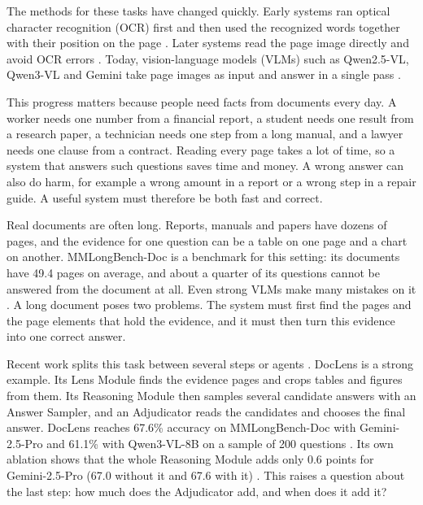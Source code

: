 \documentclass[pdflatex,sn-basic]{sn-jnl}%
\theoremstyle{thmstyletwo}%
\begin{document}
The methods for these tasks have changed quickly. Early systems ran optical character recognition (OCR) first and then used the recognized words together with their position on the page \cite{huang2022layoutlmv3}. Later systems read the page image directly and avoid OCR errors \cite{kim2022donut}. Today, vision-language models (VLMs) such as Qwen2.5-VL, Qwen3-VL and Gemini take page images as input and answer in a single pass \cite{bai2025qwen25vl,bai2025qwen3vl,comanici2025gemini}.

This progress matters because people need facts from documents every day. A worker needs one number from a financial report, a student needs one result from a research paper, a technician needs one step from a long manual, and a lawyer needs one clause from a contract. Reading every page takes a lot of time, so a system that answers such questions saves time and money. A wrong answer can also do harm, for example a wrong amount in a report or a wrong step in a repair guide. A useful system must therefore be both fast and correct.

Real documents are often long. Reports, manuals and papers have dozens of pages, and the evidence for one question can be a table on one page and a chart on another. MMLongBench-Doc \cite{ma2024mmlongbench} is a benchmark for this setting: its documents have 49.4 pages on average, and about a quarter of its questions cannot be answered from the document at all. Even strong VLMs make many mistakes on it \cite{ma2024mmlongbench,comanici2025gemini}. A long document poses two problems. The system must first find the pages and the page elements that hold the evidence, and it must then turn this evidence into one correct answer.

Recent work splits this task between several steps or agents \cite{zhu2025doclens,jain2025simpledoc,han2025mdocagent,slideagent,orca,docvstar}. DocLens \cite{zhu2025doclens} is a strong example. Its Lens Module finds the evidence pages and crops tables and figures from them. Its Reasoning Module then samples several candidate answers with an Answer Sampler, and an Adjudicator reads the candidates and chooses the final answer. DocLens reaches 67.6\% accuracy on MMLongBench-Doc with Gemini-2.5-Pro and 61.1\% with Qwen3-VL-8B on a sample of 200 questions \cite{zhu2025doclens}. Its own ablation shows that the whole Reasoning Module adds only 0.6 points for Gemini-2.5-Pro (67.0 without it and 67.6 with it) \cite{zhu2025doclens}. This raises a question about the last step: how much does the Adjudicator add, and when does it add it?
\end{document}
